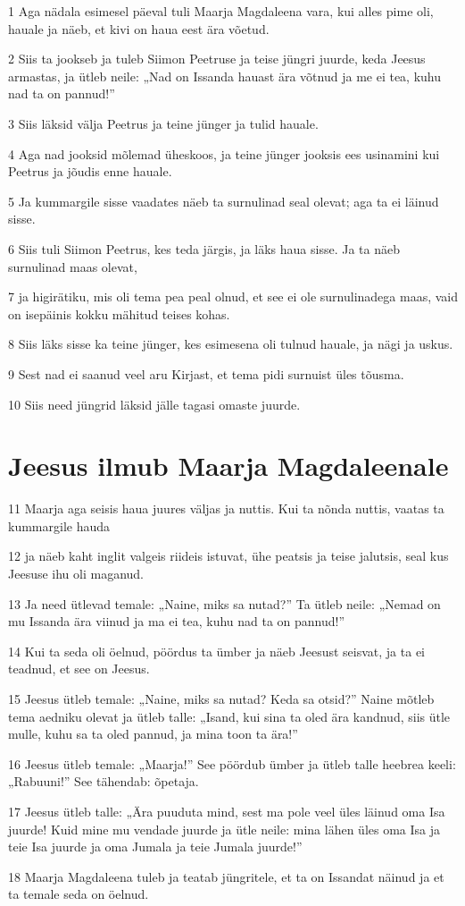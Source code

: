 \par 1 Aga nädala esimesel päeval tuli Maarja Magdaleena vara, kui alles pime oli, hauale ja näeb, et kivi on haua eest ära võetud.
\par 2 Siis ta jookseb ja tuleb Siimon Peetruse ja teise jüngri juurde, keda Jeesus armastas, ja ütleb neile: „Nad on Issanda hauast ära võtnud ja me ei tea, kuhu nad ta on pannud!”
\par 3 Siis läksid välja Peetrus ja teine jünger ja tulid hauale.
\par 4 Aga nad jooksid mõlemad üheskoos, ja teine jünger jooksis ees usinamini kui Peetrus ja jõudis enne hauale.
\par 5 Ja kummargile sisse vaadates näeb ta surnulinad seal olevat; aga ta ei läinud sisse.
\par 6 Siis tuli Siimon Peetrus, kes teda järgis, ja läks haua sisse. Ja ta näeb surnulinad maas olevat,
\par 7 ja higirätiku, mis oli tema pea peal olnud, et see ei ole surnulinadega maas, vaid on isepäinis kokku mähitud teises kohas.
\par 8 Siis läks sisse ka teine jünger, kes esimesena oli tulnud hauale, ja nägi ja uskus.
\par 9 Sest nad ei saanud veel aru Kirjast, et tema pidi surnuist üles tõusma.
\par 10 Siis need jüngrid läksid jälle tagasi omaste juurde.

\section*{Jeesus ilmub Maarja Magdaleenale}

\par 11 Maarja aga seisis haua juures väljas ja nuttis. Kui ta nõnda nuttis, vaatas ta kummargile hauda
\par 12 ja näeb kaht inglit valgeis riideis istuvat, ühe peatsis ja teise jalutsis, seal kus Jeesuse ihu oli maganud.
\par 13 Ja need ütlevad temale: „Naine, miks sa nutad?” Ta ütleb neile: „Nemad on mu Issanda ära viinud ja ma ei tea, kuhu nad ta on pannud!”
\par 14 Kui ta seda oli öelnud, pöördus ta ümber ja näeb Jeesust seisvat, ja ta ei teadnud, et see on Jeesus.
\par 15 Jeesus ütleb temale: „Naine, miks sa nutad? Keda sa otsid?” Naine mõtleb tema aedniku olevat ja ütleb talle: „Isand, kui sina ta oled ära kandnud, siis ütle mulle, kuhu sa ta oled pannud, ja mina toon ta ära!”
\par 16 Jeesus ütleb temale: „Maarja!” See pöördub ümber ja ütleb talle heebrea keeli: „Rabuuni!” See tähendab: õpetaja.
\par 17 Jeesus ütleb talle: „Ära puuduta mind, sest ma pole veel üles läinud oma Isa juurde! Kuid mine mu vendade juurde ja ütle neile: mina lähen üles oma Isa ja teie Isa juurde ja oma Jumala ja teie Jumala juurde!”
\par 18 Maarja Magdaleena tuleb ja teatab jüngritele, et ta on Issandat näinud ja et ta temale seda on öelnud.

